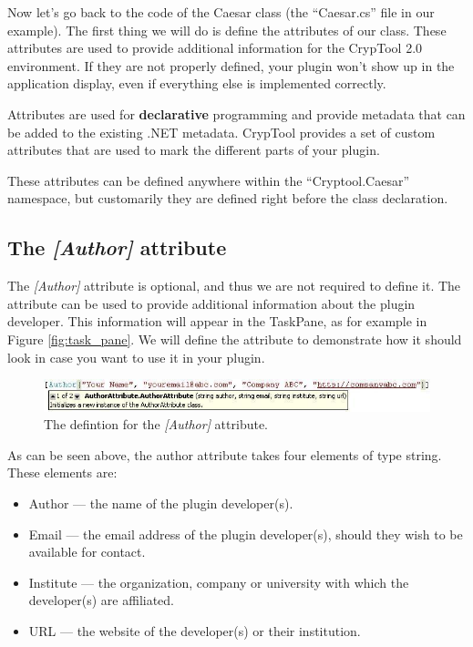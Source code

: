Now let's go back to the code of the Caesar class (the ``Caesar.cs'' file in our example). The first thing we will do is define the attributes of our class. These attributes are used to provide additional information for the CrypTool 2.0 environment. If they are not properly defined, your plugin won't show up in the application display, even if everything else is implemented correctly.

Attributes are used for \textbf{declarative} programming and provide metadata that can be added to the existing .NET metadata. CrypTool provides a set of custom attributes that are used to mark the different parts of your plugin.

These attributes can be defined anywhere within the ``Cryptool.Caesar'' namespace, but customarily they are defined right before the class declaration.

\subsection{The \textit{[Author]} attribute}
\label{sec:TheAuthorAttribute}

The \textit{[Author]} attribute is optional, and thus we are not required to define it. The attribute can be used to provide additional information about the plugin developer. This information will appear in the TaskPane, as for example in Figure \ref{fig:task_pane}. We will define the attribute to demonstrate how it should look in case you want to use it in your plugin.

\begin{figure}[h!]
	\centering
		\includegraphics[width=.90\textwidth]{figures/attribute_author_new.jpg}
	\caption{The defintion for the \textit{[Author]} attribute.}
	\label{fig:attribute_author}
\end{figure}

As can be seen above, the author attribute takes four elements of type string. These elements are:

\begin{itemize}
	\item Author --- the name of the plugin developer(s).
	\item Email --- the email address of the plugin developer(s), should they wish to be available for contact.
	\item Institute --- the organization, company or university with which the developer(s) are affiliated.
	\item URL --- the website of the developer(s) or their institution.
\end{itemize}

